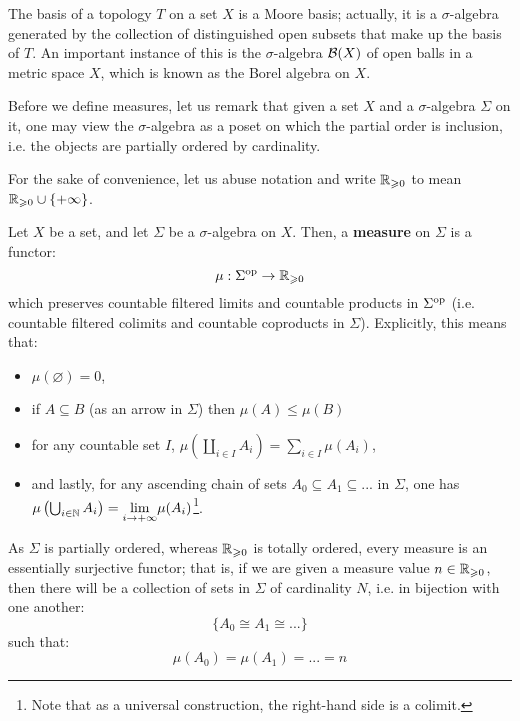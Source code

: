         \begin{example}
            The basis of a topology $T$ on a set $X$ is a Moore basis; actually, it is a $\sigma$-algebra generated by the collection of distinguished open subsets that make up the basis of $T$. An important instance of this is the $\sigma$-algebra $\mathcal{B}(X)$ of open balls in a metric space $X$, which is known as the Borel algebra on $X$.
        \end{example}
        
        \begin{remark}
            Before we define measures, let us remark that given a set $X$ and a $\sigma$-algebra $\Sigma$ on it, one may view the $\sigma$-algebra as a poset on which the partial order is inclusion, i.e. the objects are partially ordered by cardinality.
        \end{remark}
        \begin{convention}
            For the sake of convenience, let us abuse notation and write $\mathbb{R}_{\geqslant 0}$ to mean $\mathbb{R}_{\geqslant 0} \cup \{+\infty\}$.
        \end{convention}
        \begin{definition}[Measures] \label{def: measures}
            Let $X$ be a set, and let $\Sigma$ be a $\sigma$-algebra on $X$. Then, a \textbf{measure} on $\Sigma$ is a functor:
                $$\mu: \Sigma^{\mathrm{op}} \to \mathbb{R}_{\geqslant 0}$$
            which preserves countable filtered limits and countable products in $\Sigma^{\mathrm{op}}$ (i.e. countable filtered colimits and countable coproducts in $\Sigma$). Explicitly, this means that:
                \begin{itemize}
                    \item $\mu(\varnothing) = 0$,
                    \item if $A \subseteq B$ (as an arrow in $\Sigma$) then $\mu(A) \leq \mu(B)$
                    \item for any countable set $I$, $\mu\left(\coprod_{i \in I} A_i\right) = \sum_{i \in I} \mu(A_i)$, 
                    \item and lastly, for any ascending chain of sets $A_0 \subseteq A_1 \subseteq ...$ in $\Sigma$, one has $\mu\left(\bigcup_{i \in \mathbb{N}} A_i\right) = \underset{i \to +\infty}{\lim} \mu(A_i)$\footnote{Note that as a universal construction, the right-hand side is a colimit.}.
                \end{itemize}
        \end{definition}
        \begin{remark}
            As $\Sigma$ is partially ordered, whereas $\mathbb{R}_{\geqslant 0}$ is totally ordered, every measure is an essentially surjective functor; that is, if we are given a measure value $n \in \mathbb{R}_{\geqslant 0}$, then there will be a collection of sets in $\Sigma$ of cardinality $N$, i.e. in bijection with one another:
                $$\{A_0 \cong A_1 \cong ...\}$$
            such that:
                $$\mu(A_0) = \mu(A_1) = ... = n$$
        \end{remark}
